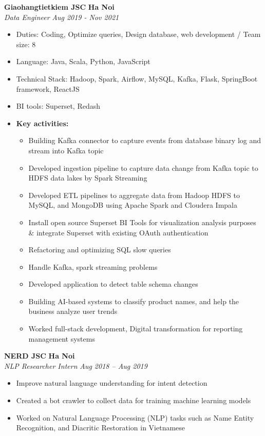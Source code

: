 \documentclass[11pt,a4paper,roman]{moderncv}
\newcommand*{\customcventry}[6][.25em]{%
    {\bfseries #4} \hfill {\bfseries #5} \\
    {\itshape #3} \hfill {\itshape #2}
    \ifx\relax#6\relax\else\\#6\fi
    \par\addvspace{#1}}
\begin{document}
    \customcventry{Aug 2019 - Nov 2021}{Data Engineer}{Giaohangtietkiem JSC}{Ha Noi}{}
    \begin{itemize}
        \item Duties: Coding, Optimize queries, Design database, web development / Team size: 8
        \item Language: Java, Scala, Python, JavaScript
        \item Technical Stack: Hadoop, Spark, Airflow, MySQL, Kafka, Flask, SpringBoot framework, ReactJS
        \item BI tools: Superset, Redash
        \item \textbf{Key activities:}
        \begin{itemize}
            \item Building Kafka connector to capture events from database binary log and stream into Kafka topic
            \item Developed ingestion pipeline to capture data change from Kafka topic to HDFS data lakes by Spark Streaming
            \item Developed ETL pipelines to aggregate data from Hadoop HDFS to MySQL, and MongoDB using Apache Spark and Cloudera Impala
            \item Install open source Superset BI Tools for visualization analysis purposes \& integrate Superset with existing OAuth authentication
            \item Refactoring and optimizing SQL slow queries
            \item Handle Kafka, spark streaming problems
            \item Developed application to detect table schema changes
            \item Building AI-based systems to classify product names, and help the business analyze user trends
            \item Worked full-stack development, Digital transformation for reporting management systems
        \end{itemize}
    \end{itemize}

    \customcventry{Aug 2018 – Aug 2019}{NLP Researcher Intern}{NERD JSC}{Ha Noi}{}
    \begin{itemize}
        \item Improve natural language understanding for intent detection
        \item Created a bot crawler to collect data for training machine learning models
        \item Worked on Natural Language Processing (NLP) tasks such as Name Entity Recognition, and Diacritic Restoration in Vietnamese
    \end{itemize}
\end{document}
